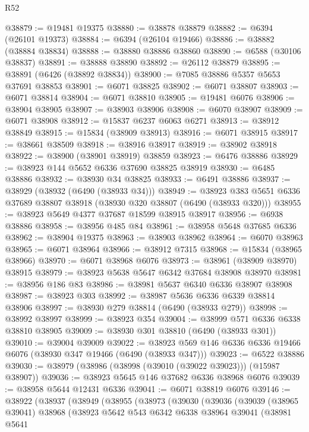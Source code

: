 \begin{lexlean}{R52}
\begin{coremodule}
@38879 := @19481 @19375
@38880 := @38878 @38879
@38882 := @6394 (@26101 @19373)
@38884 := @6394 (@26104 @19466)
@38886 := @38882 (@38884 @38834)
@38888 := @38880 @38886 @38860
@38890 := @6588 (@30106 @38837)
@38891 := @38888 @38890
@38892 := @26112 @38879
@38895 := @38891 (@6426 (@38892 @38834))
@38900 := @7085 @38886 @5357 @5653 @37691 @38853
@38901 := @6071 @38825
@38902 := @6071 @38807
@38903 := @6071 @38814
@38904 := @6071 @38810
@38905 := @19481 @6076
@38906 := @38904 @38905
@38907 := @38903 @38906
@38908 := @6070 @38907
@38909 := @6071 @38908
@38912 := @15837 @6237 @6063 @6271
@38913 := @38912 @38849
@38915 := @15834 (@38909 @38913)
@38916 := @6071 @38915
@38917 := @38661 @38509
@38918 := @38916 @38917
@38919 := @38902 @38918
@38922 := @38900 (@38901 @38919) @38859
@38923 := @6476 @38886
@38929 := @38923 @144 @5652 @6336 @37690 @38825 @38919
@38930 := @6485 @38886
@38932 := @38930 @34 @38825
@38933 := @6491 @38886
@38937 := @38929 (@38932 (@6490 (@38933 @34)))
@38949 := @38923 @383 @5651 @6336 @37689 @38807 @38918 (@38930 @320 @38807 (@6490 (@38933 @320)))
@38955 := @38923 @5649 @4377 @37687 @18599 @38915 @38917
@38956 := @6938 @38886
@38958 := @38956 @485 @84
@38961 := @38958 @5648 @37685 @6336
@38962 := @38904 @19375
@38963 := @38903 @38962
@38964 := @6070 @38963
@38965 := @6071 @38964
@38966 := @38912 @7315
@38968 := @15834 (@38965 @38966)
@38970 := @6071 @38968 @6076
@38973 := @38961 (@38909 @38970) @38915
@38979 := @38923 @5638 @5647 @6342 @37684 @38908 @38970
@38981 := @38956 @186 @83
@38986 := @38981 @5637 @6340 @6336 @38907 @38908
@38987 := @38923 @303
@38992 := @38987 @5636 @6336 @6339 @38814 @38906
@38997 := @38930 @279 @38814 (@6490 (@38933 @279))
@38998 := @38992 @38997
@38999 := @38923 @354
@39004 := @38999 @571 @6336 @6338 @38810 @38905
@39009 := @38930 @301 @38810 (@6490 (@38933 @301))
@39010 := @39004 @39009
@39022 := @38923 @569 @146 @6336 @6336 @19466 @6076 (@38930 @347 @19466 (@6490 (@38933 @347)))
@39023 := @6522 @38886
@39030 := @38979 (@38986 (@38998 (@39010 (@39022 @39023))) (@15987 @38907))
@39036 := @38923 @5645 @146 @37682 @6336 @38968 @6076
@39039 := @38958 @5644 @12431 @6336
@39041 := @6071 @38819 @6076
@39146 := @38922
    (@38937
      (@38949
        (@38955
          (@38973
            (@39030
              (@39036
                (@39039
                  (@38965 @39041)
                  @38968
                  (@38923
                    @5642
                    @543
                    @6342
                    @6338
                    @38964
                    @39041
                    (@38981
                      @5641

\end{coremodule}
\end{lexlean}
